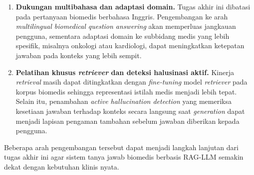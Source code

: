 \begin{enumerate}
    \item \textbf{Dukungan multibahasa dan adaptasi domain.}
    Tugas akhir ini dibatasi pada pertanyaan biomedis berbahasa Inggris. Pengembangan ke arah \textit{multilingual biomedical question answering} akan memperluas jangkauan pengguna, sementara adaptasi domain ke subbidang medis yang lebih spesifik, misalnya onkologi atau kardiologi, dapat meningkatkan ketepatan jawaban pada konteks yang lebih sempit.

    \item \textbf{Pelatihan khusus \textit{retriever} dan deteksi halusinasi aktif.}
    Kinerja \textit{retrieval} masih dapat ditingkatkan dengan \textit{fine-tuning} model \textit{retriever} pada korpus biomedis sehingga representasi istilah medis menjadi lebih tepat. Selain itu, penambahan \textit{active hallucination detection} yang memeriksa kesetiaan jawaban terhadap konteks secara langsung saat \textit{generation} dapat menjadi lapisan pengaman tambahan sebelum jawaban diberikan kepada pengguna.
\end{enumerate}

Beberapa arah pengembangan tersebut dapat menjadi langkah lanjutan dari tugas akhir ini agar sistem tanya jawab biomedis berbasis RAG-LLM semakin dekat dengan kebutuhan klinis nyata.
